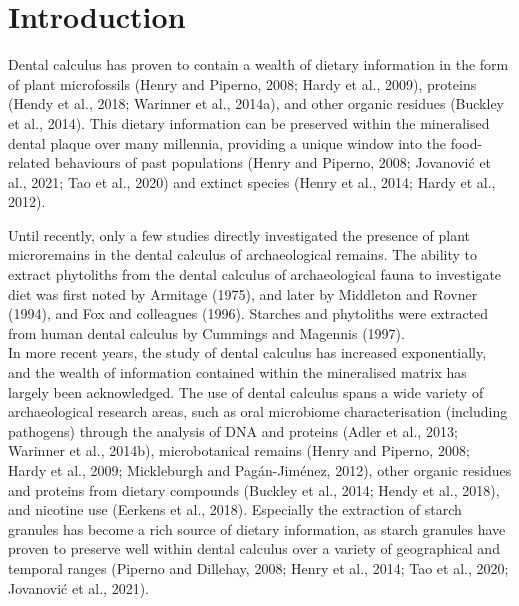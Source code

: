 \documentclass[utf8]{frontiers/frontiersSCNS}
\begin{document}
\hypertarget{introduction}{%
\section{Introduction}\label{introduction}}

Dental calculus has proven to contain a wealth of
dietary information in the form of plant microfossils
(Henry and Piperno, 2008; Hardy et al., 2009),
proteins (Hendy et al., 2018; Warinner et al., 2014a),
and other organic residues (Buckley et al., 2014).
This dietary information can be preserved within the mineralised dental plaque
over many millennia, providing a unique window into the food-related behaviours of
past populations
(Henry and Piperno, 2008; Jovanović et al., 2021; Tao et al., 2020)
and extinct species (Henry et al., 2014; Hardy et al., 2012).

Until recently, only a few studies directly investigated the presence of plant
microremains
in the dental calculus of archaeological remains. The ability to extract phytoliths
from the dental calculus of archaeological fauna to investigate diet was first
noted by Armitage (1975),
and later by Middleton and Rovner (1994),
and Fox and colleagues (1996). Starches and phytoliths were
extracted from human dental calculus by Cummings and Magennis (1997).\\
In more recent years, the study of dental calculus has increased exponentially,
and the wealth of information contained within the mineralised matrix has largely
been acknowledged. The use of dental calculus spans a wide
variety of archaeological research areas, such as oral microbiome
characterisation (including pathogens) through the analysis of DNA and proteins
(Adler et al., 2013; Warinner et al., 2014b),
microbotanical remains (Henry and Piperno, 2008; Hardy et al., 2009; Mickleburgh and Pagán-Jiménez, 2012),
other organic residues and proteins from dietary compounds
(Buckley et al., 2014; Hendy et al., 2018),
and nicotine use (Eerkens et al., 2018). Especially the extraction
of starch granules has become a rich source of dietary
information, as starch granules have proven to preserve well within dental calculus
over a variety of geographical and temporal ranges
(Piperno and Dillehay, 2008; Henry et al., 2014; Tao et al., 2020; Jovanović et al., 2021).
\end{document}
